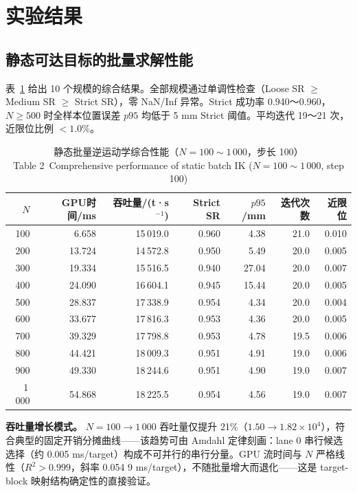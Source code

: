 \documentclass[twocolumn,a4paper,10pt]{ctexart}
\begin{document}
\section{实验结果}

\subsection{静态可达目标的批量求解性能}

表~\ref{tab:static} 给出 10 个规模的综合结果。全部规模通过单调性检查（Loose SR $\ge$ Medium SR $\ge$ Strict SR），零 NaN/Inf 异常。Strict 成功率 0.940～0.960，$N\ge500$ 时全样本位置误差 $p95$ 均低于 5 mm Strict 阈值。平均迭代 19～21 次，近限位比例 $<1.0\%$。

\begin{table}[tp]
\centering
\caption{静态批量逆运动学综合性能（$N=100\sim1\,000$，步长 100）\\[2pt] {\small Table 2~Comprehensive performance of static batch IK ($N=100\sim1\,000$, step 100)}}
\label{tab:static}
\small
\begin{tabular}{rrrrrrr}
\toprule
$N$ & GPU时间/ms & 吞吐量/(t·s$^{-1}$) & Strict SR & $p95$/mm & 迭代次数 & 近限位\\
\midrule
100  & 6.658  & 15\,019.0 & 0.960 & 4.38 & 21.0 & 0.010\\
200  & 13.724 & 14\,572.8 & 0.950 & 5.49 & 20.0 & 0.005\\
300  & 19.334 & 15\,516.5 & 0.940 & 27.04 & 20.0 & 0.007\\
400  & 24.090 & 16\,604.1 & 0.945 & 15.44 & 20.0 & 0.005\\
500  & 28.837 & 17\,338.9 & 0.954 & 4.34 & 20.0 & 0.004\\
600  & 33.677 & 17\,816.3 & 0.953 & 4.36 & 20.0 & 0.005\\
700  & 39.329 & 17\,798.8 & 0.953 & 4.78 & 19.5 & 0.006\\
800  & 44.421 & 18\,009.3 & 0.951 & 4.91 & 19.0 & 0.006\\
900  & 49.330 & 18\,244.6 & 0.951 & 4.90 & 19.0 & 0.007\\
1\,000 & 54.868 & 18\,225.5 & 0.954 & 4.56 & 19.0 & 0.007\\
\bottomrule
\end{tabular}
\end{table}

\textbf{吞吐量增长模式。} $N=100\to1\,000$ 吞吐量仅提升 21\%（$1.50\to1.82\times10^4$），符合典型的固定开销分摊曲线——该趋势可由 Amdahl 定律刻画：lane 0 串行候选选择（约 0.005 ms/target）构成不可并行的串行分量。GPU 流时间与 $N$ 严格线性（$R^2>0.999$，斜率 0.054 9 ms/target），不随批量增大而退化——这是 target-block 映射结构确定性的直接验证。
\end{document}
